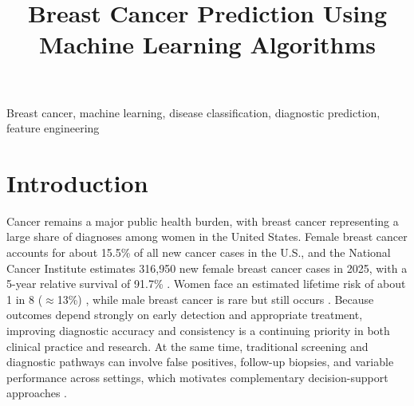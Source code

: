 \documentclass[conference]{IEEEtran}
\begin{document}
\title{Breast Cancer Prediction Using Machine Learning Algorithms}

\author{
\and
{}
\and
{}
}

\maketitle

\begin{IEEEkeywords}
Breast cancer, machine learning, disease classification, diagnostic prediction, feature engineering
\end{IEEEkeywords}

\section{Introduction}
Cancer remains a major public health burden, with breast cancer representing a large share of diagnoses among women in the United States. Female breast cancer accounts for about 15.5\% of all new cancer cases in the U.S., and the National Cancer Institute estimates 316,950 new female breast cancer cases in 2025, with a 5-year relative survival of 91.7\% \cite{b1,b2}. Women face an estimated lifetime risk of about 1 in 8 ($\approx$13\%) \cite{b3}, while male breast cancer is rare but still occurs \cite{b4}. Because outcomes depend strongly on early detection and appropriate treatment, improving diagnostic accuracy and consistency is a continuing priority in both clinical practice and research. At the same time, traditional screening and diagnostic pathways can involve false positives, follow-up biopsies, and variable performance across settings, which motivates complementary decision-support approaches \cite{b5,b6}.
\end{document}
